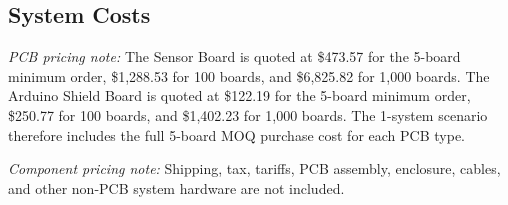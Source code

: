     \subsection{System Costs}
        \begin{table}[H]
            \centering
            \caption{System Cost versus Production Quantity}
            \label{tab:component-cost-summary}
            \vspace{0.5em}

            \begin{minipage}{0.95\textwidth}
                \footnotesize
                	\textit{PCB pricing note:} The Sensor Board is quoted at \$473.57 for the 5-board minimum order, \$1,288.53 for 100 boards, and \$6,825.82 for 1,000 boards. The Arduino Shield Board is quoted at \$122.19 for the 5-board minimum order, \$250.77 for 100 boards, and \$1,402.23 for 1,000 boards. The 1-system scenario therefore includes the full 5-board MOQ purchase cost for each PCB type.

                    \textit{Component pricing note:} Shipping, tax, tariffs, PCB assembly, enclosure, cables, and other non-PCB system hardware are not included.
            \end{minipage}
        \end{table}